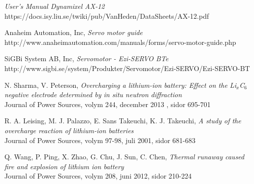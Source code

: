 \documentclass[a4paper,12pt]{article}
\begin{document}
\begin{thebibliography}{9}
 \emph{User's Manual Dynamixel AX-12}
 \\ https://docs.isy.liu.se/twiki/pub/VanHeden/DataSheets/AX-12.pdf

 Anaheim Automation, Inc, \emph{Servo motor guide}
\\ http://www.anaheimautomation.com/manuals/forms/servo-motor-guide.php

 SiGBi System AB, Inc, \emph{Servomotor - Ezi-SERVO BTe}\\
http://www.sigbi.se/system/Produkter/Servomotor/Ezi-SERVO/Ezi-SERVO-BT

 N. Sharma, V. Peterson, \emph{Overcharging a lithium-ion battery: Effect on the Li$_{x}$C$_{6}$ negative electrode determined by in situ neutron diffraction}
\\ Journal of Power Sources, volym 244, december 2013 , sidor 695-701

 R. A. Leising, M. J. Palazzo, E. Sans Takeuchi, K. J. Takeuchi, \emph{A study of the overcharge reaction of lithium-ion batteries}
\\ Journal of Power Sources, volym 97-98, juli 2001, sidor 681-683

 Q. Wang, P. Ping, X. Zhao, G. Chu, J. Sun, C. Chen, \emph{Thermal runaway caused fire and explosion of lithium ion battery}
\\ Journal of Power Sources, volym 208, juni 2012, sidor 210-224

\end{thebibliography}
\end{document}
